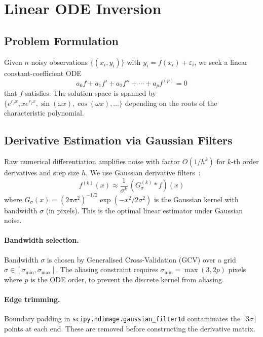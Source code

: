 \documentclass[11pt,a4paper]{article}
\begin{document}
\section{Linear ODE Inversion}
\label{sec:linear_ode}

\subsection{Problem Formulation}

Given $n$ noisy observations $\{(x_i, y_i)\}$ with $y_i = f(x_i) + \varepsilon_i$, we seek
a linear constant-coefficient ODE
\begin{equation}
  a_0 f + a_1 f' + a_2 f'' + \cdots + a_p f^{(p)} = 0
\end{equation}
that $f$ satisfies. The solution space is spanned by $\{e^{r_j x}, xe^{r_j x}, \sin(\omega x),
\cos(\omega x), \ldots\}$ depending on the roots of the characteristic polynomial.

\subsection{Derivative Estimation via Gaussian Filters}

Raw numerical differentiation amplifies noise with factor $O(1/h^k)$ for $k$-th order
derivatives and step size $h$. We use Gaussian derivative filters~\cite{lindeberg1994}:
\begin{equation}
  f^{(k)}(x) \approx \frac{1}{\sigma^k}\,(G_\sigma^{(k)} * f)(x)
\end{equation}
where $G_\sigma(x) = (2\pi\sigma^2)^{-1/2}\exp(-x^2/2\sigma^2)$ is the Gaussian kernel
with bandwidth $\sigma$ (in pixels). This is the optimal linear estimator under Gaussian noise.

\paragraph{Bandwidth selection.}
Bandwidth $\sigma$ is chosen by Generalised Cross-Validation (GCV) over a grid
$\sigma \in [\sigma_{\min}, \sigma_{\max}]$. The aliasing constraint requires
$\sigma_{\min} = \max(3, 2 p)$ pixels where $p$ is the ODE order, to prevent
the discrete kernel from aliasing.

\paragraph{Edge trimming.}
Boundary padding in \texttt{scipy.ndimage.gaussian\_filter1d} contaminates the
$\lceil 3\sigma \rceil$ points at each end. These are removed before constructing
the derivative matrix.
\end{document}
